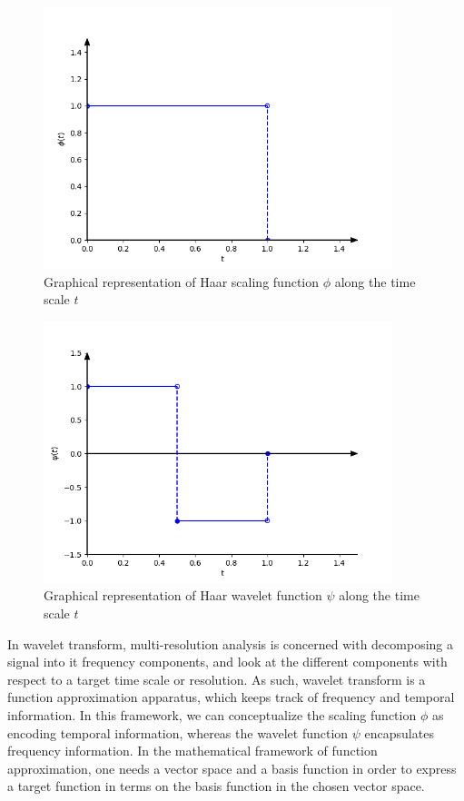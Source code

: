 \documentclass[../Main/thesis.tex]{subfiles}
\begin{document}
\begin{figure}[H] %
   \centering
   \includegraphics[width=4in]{../fig/haar-phi.png} 
   \caption{Graphical representation of Haar scaling function $\phi$ along the time scale $t$}
   \label{fig:haar-phi}
\end{figure}
\begin{figure}[H] %
   \centering
   \includegraphics[width=4in]{../fig/haar-psi.png} 
   \caption{Graphical representation of Haar wavelet function $\psi$ along the time scale $t$}
   \label{fig:haar-psi}
\end{figure}
\clearpage
\justify
In wavelet transform, multi-resolution analysis is concerned with decomposing a signal into it frequency components, and look at the different components with respect to a target time scale or resolution. As such, wavelet transform is a function approximation apparatus, which keeps track of frequency and temporal information. In this framework, we can conceptualize the scaling function $\phi$ as encoding temporal information, whereas the wavelet function $\psi$ encapsulates frequency information. In the mathematical framework of function approximation, one needs a vector space and a basis function in order to express a target function in terms on the basis function in the chosen vector space.
\end{document}
